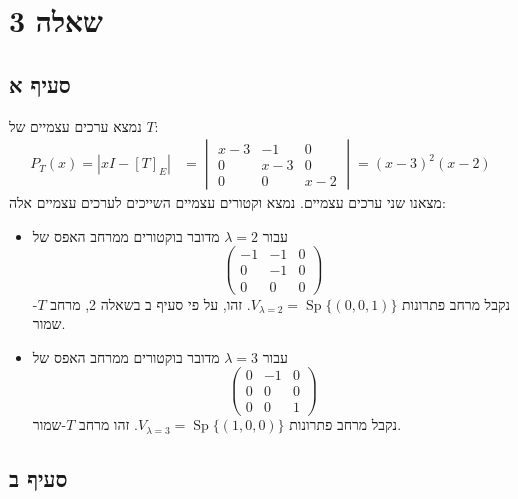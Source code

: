 \documentclass{article}
\DeclareMathOperator{\Sp}{Sp}
\begin{document}
\pagebreak

\section*{שאלה 3}

\subsection*{סעיף א}

נמצא ערכים עצמיים של $T$:
\begin{align*}
    P_T(x)=|xI-[T]_E| & =\begin{vmatrix}
                             x-3 & -1  & 0   \\
                             0   & x-3 & 0   \\
                             0   & 0   & x-2
                         \end{vmatrix}=(x-3)^2(x-2)
\end{align*}
מצאנו שני ערכים עצמיים. נמצא וקטורים עצמיים השייכים לערכים עצמיים אלה:
\begin{itemize}
    \item עבור $\lambda=2$ מדובר בוקטורים ממרחב האפס של \[
              \begin{pmatrix}
                  -1 & -1 & 0 \\
                  0  & -1 & 0 \\
                  0  & 0  & 0
              \end{pmatrix}
          \]
          נקבל מרחב פתרונות $V_{\lambda=2}=\Sp\{ (0,0,1) \}$. זהו, על פי סעיף ב בשאלה 2, מרחב $T$-שמור. \\
    \item עבור $\lambda=3$ מדובר בוקטורים ממרחב האפס של \[
              \begin{pmatrix}
                  0 & -1 & 0 \\
                  0 & 0  & 0 \\
                  0 & 0  & 1
              \end{pmatrix}
          \]
          נקבל מרחב פתרונות $V_{\lambda=3}=\Sp\{ (1,0,0) \}$. זהו מרחב $T$-שמור.
\end{itemize}

\subsection*{סעיף ב}
\end{document}
